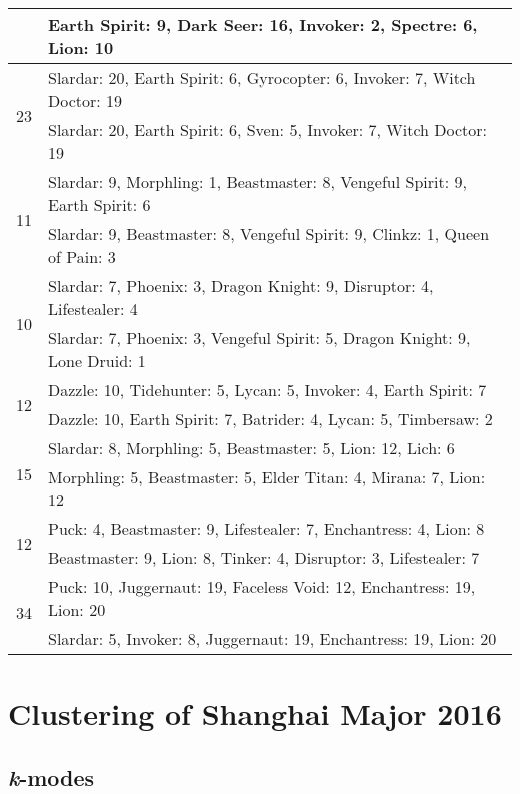 \documentclass[result.tex]{subfiles}
\begin{document}
\begin{table}[H]
\begin{tabular}{ | c | p{12.5cm} | }
    & Earth Spirit: 9, Dark Seer: 16, Invoker: 2, Spectre: 6, Lion: 10 \\
    \hline
    \multirow{2}{*}{23}
    & Slardar: 20, Earth Spirit: 6, Gyrocopter: 6, Invoker: 7, Witch Doctor: 19 \\
    & Slardar: 20, Earth Spirit: 6, Sven: 5, Invoker: 7, Witch Doctor: 19 \\
    \hline
    \multirow{2}{*}{11}
    & Slardar: 9, Morphling: 1, Beastmaster: 8, Vengeful Spirit: 9, Earth Spirit: 6 \\
    & Slardar: 9, Beastmaster: 8, Vengeful Spirit: 9, Clinkz: 1, Queen of Pain: 3 \\
    \hline
    \multirow{2}{*}{10}
    & Slardar: 7, Phoenix: 3, Dragon Knight: 9, Disruptor: 4, Lifestealer: 4 \\
    & Slardar: 7, Phoenix: 3, Vengeful Spirit: 5, Dragon Knight: 9, Lone Druid: 1 \\
    \hline
    \multirow{2}{*}{12}
    & Dazzle: 10, Tidehunter: 5, Lycan: 5, Invoker: 4, Earth Spirit: 7 \\
    & Dazzle: 10, Earth Spirit: 7, Batrider: 4, Lycan: 5, Timbersaw: 2 \\
    \hline
    \multirow{2}{*}{15}
    & Slardar: 8, Morphling: 5, Beastmaster: 5, Lion: 12, Lich: 6 \\
    & Morphling: 5, Beastmaster: 5, Elder Titan: 4, Mirana: 7, Lion: 12 \\
    \hline
    \multirow{2}{*}{12}
    & Puck: 4, Beastmaster: 9, Lifestealer: 7, Enchantress: 4, Lion: 8 \\
    & Beastmaster: 9, Lion: 8, Tinker: 4, Disruptor: 3, Lifestealer: 7 \\
    \hline
    \multirow{2}{*}{34}
    & Puck: 10, Juggernaut: 19, Faceless Void: 12, Enchantress: 19, Lion: 20 \\
    & Slardar: 5, Invoker: 8, Juggernaut: 19, Enchantress: 19, Lion: 20 \\
    \hline
  \end{tabular}
  \caption{}
  \label{}
\end{table}

\newpage

\section*{Clustering of Shanghai Major 2016}

\subsection*{\textit{k}-modes}
\end{document}
